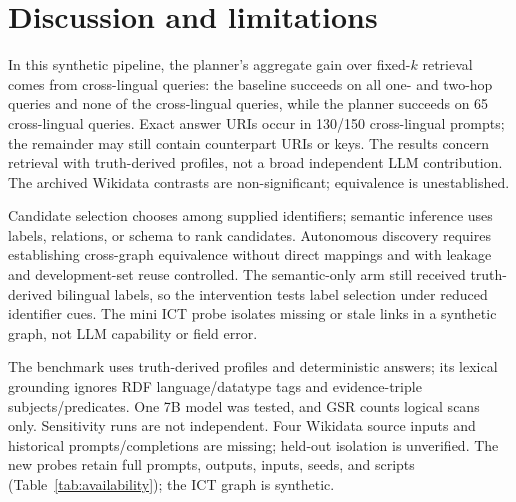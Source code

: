 \documentclass[a4paper,fleqn]{cas-dc}
\begin{document}
\begin{table}[t]
\centering\scriptsize

\caption{Six paired contrasts recalculated from the archived query-level Wikidata outcomes. Counts are strict successes under the archived Wikidata evaluator. All Holm-adjusted probabilities use the same six-test family; none is below 0.05. The held-out 19/21 result is descriptive and exploratory, not evidence of autonomous alignment.}
\label{tab:wikidata}
\end{table}

\section{Discussion and limitations}\label{sec:discussion}
In this synthetic pipeline, the planner's aggregate gain over fixed-$k$ retrieval comes from cross-lingual queries: the baseline succeeds on all one- and two-hop queries and none of the cross-lingual queries, while the planner succeeds on 65 cross-lingual queries. Exact answer URIs occur in 130/150 cross-lingual prompts; the remainder may still contain counterpart URIs or keys. The results concern retrieval with truth-derived profiles, not a broad independent LLM contribution. The archived Wikidata contrasts are non-significant; equivalence is unestablished.

Candidate selection chooses among supplied identifiers; semantic inference uses labels, relations, or schema to rank candidates. Autonomous discovery requires establishing cross-graph equivalence without direct mappings and with leakage and development-set reuse controlled. The semantic-only arm still received truth-derived bilingual labels, so the intervention tests label selection under reduced identifier cues. The mini ICT probe isolates missing or stale links in a synthetic graph, not LLM capability or field error.

The benchmark uses truth-derived profiles and deterministic answers; its lexical grounding ignores RDF language/datatype tags and evidence-triple subjects/predicates. One 7B model was tested, and GSR counts logical scans only. Sensitivity runs are not independent. Four Wikidata source inputs and historical prompts/completions are missing; held-out isolation is unverified. The new probes retain full prompts, outputs, inputs, seeds, and scripts (Table~\ref{tab:availability}); the ICT graph is synthetic.
\end{document}

